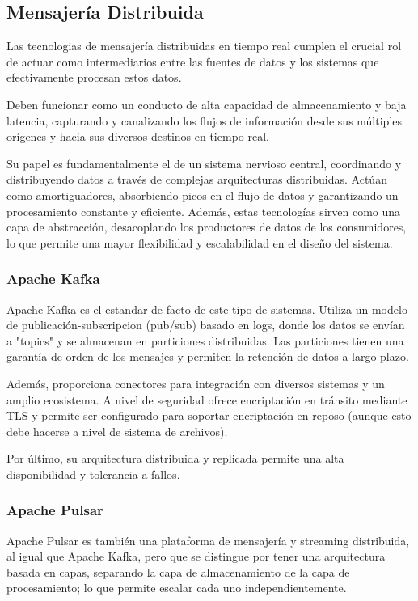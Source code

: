 \subsection{Mensajería Distribuida}

Las tecnologias de mensajería distribuidas en tiempo real cumplen el crucial rol de actuar como intermediarios entre las fuentes de datos 
y los sistemas que efectivamente procesan estos datos. \parencite{kleppmann} 

Deben funcionar como un conducto de alta capacidad de almacenamiento y baja latencia, capturando y canalizando los flujos de información
desde sus múltiples orígenes y hacia sus diversos destinos en tiempo real. \parencite{bigdata}

Su papel es fundamentalmente el de un sistema nervioso central, coordinando y distribuyendo datos a través de complejas arquitecturas distribuidas. 
Actúan como amortiguadores, absorbiendo picos en el flujo de datos y garantizando un procesamiento constante y eficiente. 
Además, estas tecnologías sirven como una capa de abstracción, desacoplando los productores de datos de los consumidores, 
lo que permite una mayor flexibilidad y escalabilidad en el diseño del sistema.

\subsubsection{Apache Kafka}
Apache Kafka es el estandar de facto de este tipo de sistemas. Utiliza un modelo de publicación-subscripcion (pub/sub) basado en logs, 
donde los datos se envían a "topics" y se almacenan en particiones distribuidas. Las particiones tienen una garantía de orden de los mensajes
y permiten la retención de datos a largo plazo.

Además, proporciona conectores para integración con diversos sistemas y un amplio ecosistema. A nivel de seguridad ofrece encriptación
en tránsito mediante TLS y permite ser configurado para soportar encriptación en reposo (aunque esto debe hacerse a nivel de sistema de archivos).

Por último, su arquitectura distribuida y replicada permite una alta disponibilidad y tolerancia a fallos.

\newpage
\subsubsection{Apache Pulsar}
Apache Pulsar es también una plataforma de mensajería y streaming distribuida, al igual que Apache Kafka, pero que se distingue por tener una 
arquitectura basada en capas, separando la capa de almacenamiento de la capa de procesamiento; lo que permite escalar cada uno independientemente.

